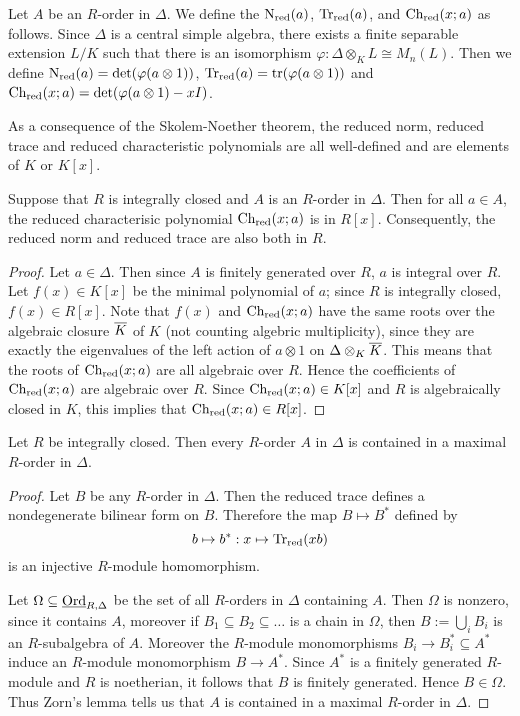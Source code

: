 \begin{defn}
Let $A$ be an $R$-order in $\Delta$.  We define the  $\textnormal{N}_{\text{red}}(a)$,  $\textnormal{Tr}_{\text{red}}(a)$, and  $\textnormal{Ch}_{\text{red}}(x;a)$ as follows.  
Since $\Delta$ is a central simple algebra, there exists a finite separable extension $L/K$ such that there is an isomorphism $\varphi: \Delta\otimes_KL\cong M_n(L)$.  Then we define $\textnormal{N}_{\text{red}}(a) = \det(\varphi(a\otimes 1))$, $\textnormal{Tr}_{\text{red}}(a) = \text{tr}(\varphi(a\otimes 1))$ and $\textnormal{Ch}_{\text{red}}(x;a) = \det(\varphi(a\otimes 1)-xI)$.
\end{defn}
As a consequence of the Skolem-Noether theorem, the reduced norm, reduced trace and reduced characteristic polynomials are all well-defined and are elements of $K$ or $K[x]$.
\begin{lem}
Suppose that $R$ is integrally closed and $A$ is an $R$-order in $\Delta$.  Then for all $a\in A$, the reduced characterisic polynomial $\textnormal{Ch}_{\text{red}}(x;a)$ is in $R[x]$.  Consequently, the reduced norm and reduced trace are also both in $R$.
\end{lem}
\begin{proof}
Let $a\in \Delta$.  Then since $A$ is finitely generated over $R$, $a$ is integral over $R$.  Let $f(x)\in K[x]$ be the minimal polynomial of $a$; since $R$ is integrally closed, $f(x)\in R[x]$.  Note that $f(x)$ and $\textnormal{Ch}_{\text{red}}(x;a)$ have the same roots over the algebraic closure $\overline{K}$ of $K$ (not counting algebric multiplicity), since they are exactly the eigenvalues of the left action of $a\otimes 1$ on $\Delta\otimes_K\overline{K}$.  This means that the roots of $\textnormal{Ch}_{\text{red}}(x;a)$ are all algebraic over $R$.  Hence the coefficients of $\textnormal{Ch}_{\text{red}}(x;a)$ are algebraic over $R$.  Since $\textnormal{Ch}_{\text{red}}(x;a)\in K[x]$ and $R$ is algebraically closed in $K$, this implies that $\textnormal{Ch}_{\text{red}}(x;a)\in R[x]$.
\end{proof}

\begin{prop}
Let $R$ be integrally closed.  Then every $R$-order $A$ in $\Delta$ is contained in a maximal $R$-order in $\Delta$.
\end{prop}
\begin{proof}
Let $B$ be any $R$-order in $\Delta$.  Then the reduced trace defines a nondegenerate bilinear form on $B$.  Therefore the map $B\mapsto B^*$ defined by
$$b\mapsto b^*: x\mapsto \textnormal{Tr}_{\text{red}}(xb)$$
is an injective $R$-module homomorphism.

Let $\Omega\subseteq\textnormal{\underline{Ord}}_{R,\Delta}$ be the set of all $R$-orders in $\Delta$ containing $A$.  Then $\Omega$ is nonzero, since it contains $A$, moreover if $B_1\subseteq B_2\subseteq \dots$ is a chain in $\Omega$, then $B:=\bigcup_i B_i$ is an $R$-subalgebra of $A$.  Moreover the $R$-module monomorphisms $B_i\rightarrow B_i^*\subseteq A^*$ induce an $R$-module monomorphism $B\rightarrow A^*$.  Since $A^*$ is a finitely generated $R$-module and $R$ is noetherian, it follows that $B$ is finitely generated.  Hence $B\in \Omega$.  Thus Zorn's lemma tells us that $A$ is contained in a maximal $R$-order in $\Delta$.
\end{proof}

